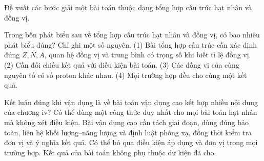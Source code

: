 \begin{bt}
Đề xuất các bước giải một bài toán thuộc dạng tổng hợp cấu trúc hạt nhân và đồng vị.
\end{bt}

\begin{ex}
Trong bốn phát biểu sau về tổng hợp cấu trúc hạt nhân và đồng vị, có bao nhiêu phát biểu đúng? Chỉ ghi một số nguyên. (1) Bài tổng hợp cấu trúc cần xác định đúng $Z,N,A$, quan hệ đồng vị và trung bình có trọng số khi biết tỉ lệ đồng vị. (2) Cần đối chiếu kết quả với điều kiện bài toán. (3) Các đồng vị của cùng nguyên tố có số proton khác nhau. (4) Mọi trường hợp đều cho cùng một kết quả.
\end{ex}

\begin{ex}
Kết luận đúng khi vận dụng là về bài toán vận dụng cao kết hợp nhiều nội dung của chương iv?
\choice
{Có thể dùng một công thức duy nhất cho mọi bài toán hạt nhân mà không xét điều kiện.}
{\True Bài vận dụng cao cần tách giai đoạn, dùng đúng bảo toàn, liên hệ khối lượng–năng lượng và định luật phóng xạ, đồng thời kiểm tra đơn vị và ý nghĩa kết quả.}
{Có thể bỏ qua điều kiện áp dụng và đơn vị trong mọi trường hợp.}
{Kết quả của bài toán không phụ thuộc dữ kiện đã cho.}
\end{ex}

